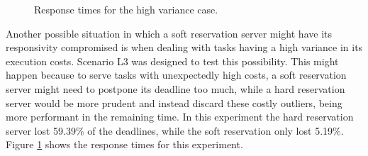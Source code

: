 \documentclass[times, 10pt,twocolumn]{article}
\begin{document}
\begin{figure}[t]
  \centering
  \caption{Response times for the high variance case.}
  \label{fig:variance}
\end{figure}

Another possible situation in which a soft reservation server might
have its responsivity compromised is when dealing with tasks having a
high variance in its execution costs. Scenario L3 was designed to test
this possibility. This might happen because to serve tasks with
unexpectedly high costs, a soft reservation server might need to
postpone its deadline too much, while a hard reservation server would
be more prudent and instead discard these costly outliers, being more
performant in the remaining time. In this experiment the hard
reservation server lost 59.39\% of the deadlines, while the soft
reservation only lost 5.19\%. Figure \ref{fig:variance} shows the
response times for this experiment.
\end{document}
